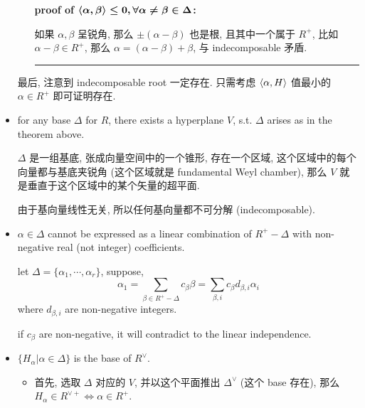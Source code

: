 \begin{itemize}
\begin{tcolorbox}[title=proof:]
\begin{itemize}
			\textbf{proof of $\boldsymbol{\braket{\alpha, \beta} \leq 0, \forall \alpha \neq \beta \in \Delta}$:}
			
			如果 $\alpha, \beta$ 呈锐角, 那么 $\pm (\alpha - \beta)$ 也是根, 且其中一个属于 $R^+$, 比如 $\alpha - \beta \in R^+$, 那么 $\alpha = (\alpha - \beta) + \beta$, 与 indecomposable 矛盾.
			
			\noindent\rule[0.5ex]{\linewidth}{0.5pt} %
		\end{itemize}
		
		最后, 注意到 indecomposable root 一定存在. 只需考虑 $\braket{\alpha, H}$ 值最小的 $\alpha \in R^+$ 即可证明存在.
	\end{tcolorbox}
	
	\item for any base $\Delta$ for $R$, there exists a hyperplane $V$, s.t. $\Delta$ arises as in the theorem above.
	
	\begin{tcolorbox}[title=proof:]
		$\Delta$ 是一组基底, 张成向量空间中的一个锥形, 存在一个区域, 这个区域中的每个向量都与基底夹锐角 (这个区域就是 fundamental Weyl chamber), 那么 $V$ 就是垂直于这个区域中的某个矢量的超平面.
		
		由于基向量线性无关, 所以任何基向量都不可分解 (indecomposable).
	\end{tcolorbox}
	
	\item $\alpha \in \Delta$ cannot be expressed as a linear combination of $R^+ - \Delta$ with non-negative real (not integer) coefficients.
	
	\begin{tcolorbox}[title=proof:]
		let $\Delta = \{\alpha_1, \cdots, \alpha_r\}$, suppose,
		\begin{equation}
			\alpha_1 = \sum_{\beta \in R^+ - \Delta} c_\beta \beta = \sum_{\beta, i} c_\beta d_{\beta, i} \alpha_i
		\end{equation}
		where $d_{\beta, i}$ are non-negative integers.
		
		if $c_\beta$ are non-negative, it will contradict to the linear independence.
	\end{tcolorbox}
	
	\item $\{H_\alpha | \alpha \in \Delta\}$ is the base of $R^\vee$.
	
	\begin{tcolorbox}[title=proof:]
		\begin{itemize}
			\item 首先, 选取 $\Delta$ 对应的 $V$, 并以这个平面推出 $\Delta^\vee$ (这个 base 存在), 那么 $H_\alpha \in R^{\vee +} \iff \alpha \in R^+$.
			

\end{itemize}
\end{tcolorbox}
\end{itemize}
